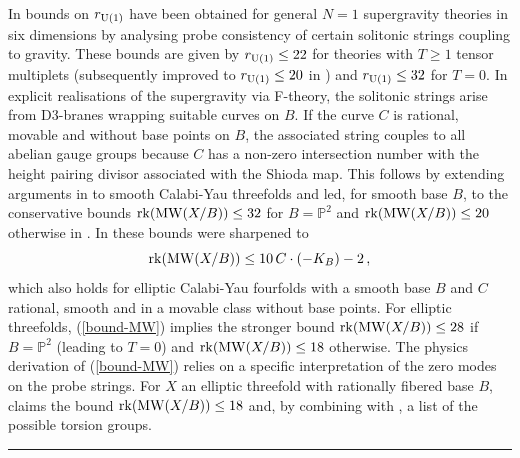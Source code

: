 \documentclass[11pt]{amsart}
\theoremstyle{definition}
\theoremstyle{definition}
\theoremstyle{remark}
\theoremstyle{remark}
\theoremstyle{definition}
\theoremstyle{conjecture}
\newcommand{\MW}{\mathrm{MW}}
\begin{document}
 
 In \cite{Lee:2019skh}  bounds on $r_{\rm U(1)}$ have been obtained for general $N=1$ supergravity theories in six dimensions by analysing probe consistency of certain solitonic strings coupling to gravity. 
 These bounds are given by $r_{\rm U(1)} \leq  22$ for theories with $T\geq 1$ tensor multiplets (subsequently improved  to $r_{\rm U(1)} \leq  20$ in \cite{Kim:2024eoa}) and $r_{\rm U(1)} \leq  32$ for $T =0$. 
  In explicit realisations of the supergravity via F-theory, the solitonic strings arise from
  D3-branes wrapping suitable curves on $B$. If the curve $C$ is rational, movable  and without base points on $B$, the associated string couples to all abelian gauge groups because $C$ has a non-zero intersection number with the height pairing divisor associated with the Shioda map. This follows by extending arguments in \cite{CoxZucker1979} to smooth Calabi-Yau threefolds \cite{Lee:2018ihr} and led, for smooth base $B$, to the conservative bounds 
  ${\rm rk}(\MW(X/B)) \leq 32$ for $B = \mathbb P^2$ and ${\rm rk}(\MW(X/B)) \leq 20$ otherwise in \cite{Lee:2019skh}. In \cite{Martucci:2022krl} these bounds were sharpened 
   to 
   \begin{equation} \label{bound-MW}
   {\rm rk}(\MW(X/B)) \leq 10\,  C \cdot (-K_B) -2 \,,
   \end{equation}
 which also holds for elliptic Calabi-Yau fourfolds with a smooth base $B$ and $C$ rational, smooth and in a movable class without base points. 
  For elliptic threefolds, (\ref{bound-MW}) implies  
the stronger bound ${\rm rk}(\MW(X/B)) \leq 28$ if $B = \mathbb P^2$ (leading to $T=0$) and  
${\rm rk}(\MW(X/B)) \leq 18$ otherwise. 
 The physics derivation of (\ref{bound-MW}) relies on a specific interpretation of the zero modes on the probe strings. For $X$ an elliptic threefold  with rationally fibered base $B$, \cite{Lee:2022swr} claims the bound ${\rm rk}(\MW(X/B)) \leq 18$ 
 and, by combining with \cite{HajoujiOehlmann}, a list of the possible torsion groups.




 \bigskip
 
 \hrule

\bigskip
\end{document}
